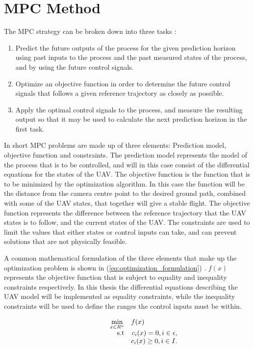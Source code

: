 \section{MPC Method}

The MPC strategy can be broken down into three tasks \cite{mpcCAMACHO}:

\begin{enumerate}
	\item Predict the future outputs of the process for the given prediction horizon using past inputs to the process and the past measured states of the process, and by using the future control signals.
	\item Optimize an objective function in order to determine the future control signals that follows a given reference trajectory as closely as possible.
	\item Apply the optimal control signals to the process, and measure the resulting output so that it may be used to calculate the next prediction horizon in the first task.
\end{enumerate}

In short MPC problems are made up of three elements: Prediction model, objective function and constraints. The prediction model represents the model of the process that is to be controlled, and will in this case consist of the differential equations for the states of the UAV. The objective function is the function that is to be minimized by the optimization algorithm. In this case the function will be the distance from the camera centre point to the desired ground path, combined with some of the UAV states, that together will give a stable flight. The objective function represents the difference between the reference trajectory that the UAV states is to follow, and the current states of the UAV. The constraints are used to limit the values that either states or control inputs can take, and can prevent solutions that are not physically feasible.

A common mathematical formulation of the three elements that make up the optimization problem is shown in (\ref{eq:optimization_formulation}) \cite{nocedalOPTIMIZATION}. $f(x)$ represents the objective function that is subject to equality and inequality constraints respectively. In this thesis the differential equations describing the UAV model will be implemented as equality constraints, while the inequality constraints will be used to define the ranges the control inputs must be within.

\begin{equation}
	\label{eq:optimization_formulation}
	\begin{array}{rrclcl}
		\displaystyle \min_{x \in R^n} & \multicolumn{3}{l}{f(x)} \\
		\textrm{s.t}
		& c_i(x) = 0, i \in \epsilon, \\
		& c_i(x) \geq 0, i \in I.
	\end{array}
\end{equation}